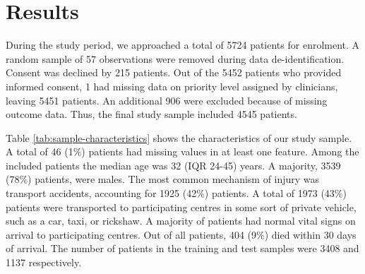 \documentclass[10pt,letterpaper]{article}\usepackage[]{graphicx}\usepackage[]{color}
\begin{document}
\section*{Results}
During the study period, we approached a total of
5724 patients for enrolment. A random sample of
57 observations were removed during data
de-identification. Consent was declined by 215 patients. Out of the
5452 patients who provided informed consent,
1 had
missing data on priority level assigned by clinicians, leaving
5451 patients. An additional
906
were excluded because of missing outcome data. Thus, the final study sample
included 4545 patients.

Table \ref{tab:sample-characteristics} shows the characteristics of our study
sample. A total of 46 (1\%) patients had
missing values in at least one feature. Among the included patients the median age
was 32 (IQR 24-45) years. A majority, 3539 (78\%)
patients, were males. The most common mechanism of injury was transport
accidents, accounting for 1925 (42\%)
patients. A total of 1973 (43\%) patients were
transported to participating centres in some sort of private vehicle, such as a
car, taxi, or rickshaw. A majority of patients had normal vital signs on arrival
to participating centres. Out of all patients, 404 (9\%)
died within 30 days of arrival. The number of patients in the training and test
samples were 3408 and 1137
respectively.
\end{document}
